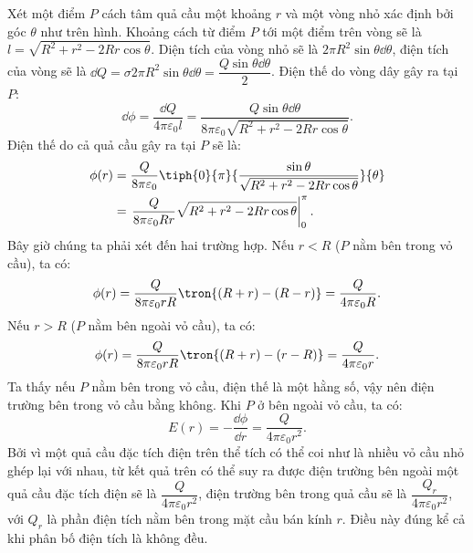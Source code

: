 \begin{loigiai}
\begin{center}
    \end{center}
        Xét một điểm $P$ cách tâm quả cầu một khoảng $r$ và một vòng nhỏ xác định bởi góc $\theta$ như trên hình. Khoảng cách từ điểm $P$ tới một điểm trên vòng sẽ là $l=\sqrt{R^2+r^2-2Rr\cos\theta}$. Diện tích của vòng nhỏ sẽ là $2\pi R^2 \sin\theta\dd\theta$, điện tích của vòng sẽ là $\dd Q=\sigma2\pi R^2 \sin\theta\dd\theta=\dfrac{Q\sin\theta\dd\theta}{2}$. Điện thế do vòng dây gây ra tại $P$:
        \begin{equation}
            \dd \phi=\dfrac{\dd Q}{4\pi\varepsilon_0 l}=\dfrac{Q\sin\theta\dd\theta}{8\pi\varepsilon_0\sqrt{R^2+r^2-2Rr\cos\theta}}.
        \end{equation}
        Điện thế do cả quả cầu gây ra tại $P$ sẽ là:
        \begin{equation}
            \begin{aligned}
               \phi(r)&=\dfrac{Q}{8\pi\varepsilon_0}\tiph{0}{\pi}{\dfrac{\sin\theta}{\sqrt{R^2+r^2-2Rr\cos\theta}}}{\theta}\\
               &=\left.\dfrac{Q}{8\pi\varepsilon_0Rr}\sqrt{R^2+r^2-2Rr\cos\theta}\right|_0^\pi.
            \end{aligned}
        \end{equation}
        Bây giờ chúng ta phải xét đến hai trường hợp. Nếu $r<R$ ($P$ nằm bên trong vỏ cầu), ta có:
        \begin{equation}
            \phi(r)=\dfrac{Q}{8\pi\varepsilon_0rR}\tron{(R+r)-(R-r)}=\dfrac{Q}{4\pi\varepsilon_0R}.
        \end{equation}
        Nếu $r>R$ ($P$ nằm bên ngoài vỏ cầu), ta có:
        \begin{equation}
            \phi(r)=\dfrac{Q}{8\pi\varepsilon_0rR}\tron{(R+r)-(r-R)}=\dfrac{Q}{4\pi\varepsilon_0r}.
        \end{equation}
        Ta thấy nếu $P$ nằm bên trong vỏ cầu, điện thế là một hằng số, vậy nên điện trường bên trong vỏ cầu bằng không. Khi $P$ ở bên ngoài vỏ cầu, ta có:
        \begin{equation}
            E(r)=-\dfrac{\dd \phi}{\dd r}=\dfrac{Q}{4\pi\varepsilon_0 r^2}.
        \end{equation}
        Bởi vì một quả cầu đặc tích điện trên thể tích có thể coi như là nhiều vỏ cầu nhỏ ghép lại với nhau, từ kết quả trên có thể suy ra được điện trường bên ngoài một quả cầu đặc tích điện sẽ là $\dfrac{Q}{4\pi\varepsilon_0 r^2}$, điện trường bên trong quả cầu sẽ là $\dfrac{Q_r}{4\pi\varepsilon_0 r^2}$, với $Q_r$ là phần điện tích nằm bên trong mặt cầu bán kính $r$. Điều này đúng kể cả khi phân bố điện tích là không đều.
    \end{loigiai}
    

